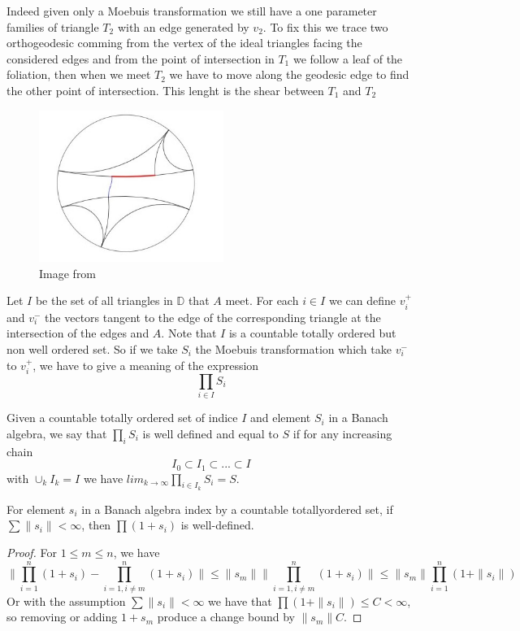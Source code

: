 Indeed given only a Moebuis transformation we still have a one parameter families of triangle $T_2$ with an edge generated by $v_2$. To fix this we trace two orthogeodesic comming from the vertex of the ideal triangles facing the considered edges and from the point of intersection in $T_1$ we follow a leaf of the foliation, then when we meet $T_2$ we have to move along the geodesic edge to find the other point of intersection. This lenght is the shear between $T_1$ and $T_2$

\begin{figure}[h!]
\centering
\includegraphics[width=6cm]{Image/Shear.jpg}
\caption{Image from \cite{wright2018mirzakhani}}
\end{figure}

Let $I$ be the set of all triangles in $\mathbb{D}$ that $A$ meet. For each $i\in I$ we can define $v_i^+$ and $v_i^-$ the vectors tangent to the edge of the corresponding triangle at the intersection of the edges and $A$. Note that $I$ is a countable totally ordered but non well ordered set. So if we take $S_i$ the Moebuis transformation which take $v_i^-$ to $v_i^+$, we have to give a meaning of the expression \[
\prod_{i\in I}S_i
\]

\begin{dfnt}
Given a countable totally ordered set of indice $I$ and element $S_i$ in a Banach algebra, we say that $\prod_i S_i$ is well defined and equal to $S$ if for any increasing chain \[
I_0 \subset I_1 \subset ... \subset I
\]
with $\cup_k I_k=I$ we have $lim_{k \to \infty} \prod_{i \in I_k}S_i =S $.
\end{dfnt}

\begin{lem}
For element $s_i$ in a Banach algebra index by a countable totallyordered set, if $\sum \| s_i \| < \infty$, then $\prod(1+s_i)$ is well-defined.
\end{lem}
\begin{proof}
For $1 \leq m \leq n$, we have \[
\| \prod_{i=1}^n(1+s_i)-\prod_{i=1,i \neq m}^n (1+s_i) \| \leq \|s_m \| \| \prod_{i=1,i \neq m}^n (1+s_i) \| \leq \|s_m\| \prod_{i=1}^n (1+\|s_i\|)
\]
Or with the assumption $\sum \| s_i \| < \infty$ we have that $\prod(1+\|s_i\|) \leq C < \infty$, so removing or adding $1+s_m$ produce a change bound by $\|s_m\| C$.
\end{proof}

